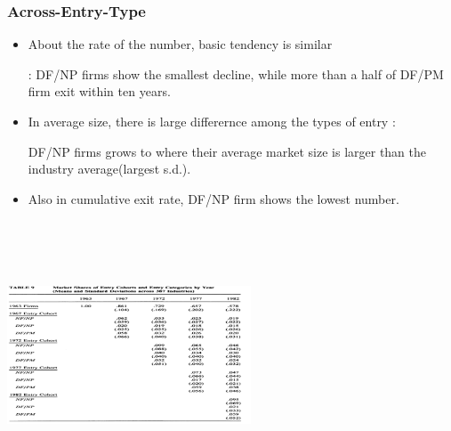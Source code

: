 \documentclass[dvipdfmx,12pt]{beamer}
\begin{document}
\begin{frame}\frametitle{Across-Entry-Type}

 \begin{itemize}
 
 \item About the rate of the number, basic tendency is similar
 
 : DF/NP firms show the smallest decline, while more than a half of DF/PM firm exit within ten years. 
 
 \item In average size, there is large differernce among the types of entry :
 
 DF/NP firms grows to where their average market size is larger than the industry average(largest s.d.).
 
 \item Also in cumulative exit rate, DF/NP firm shows the lowest number.
 
 \end{itemize}

\end{frame}

\begin{frame}

\begin{center}

\includegraphics[width=7.25cm,height=8cm]{DRS_T9.pdf}

\end{center}

\end{frame}
\end{document}
